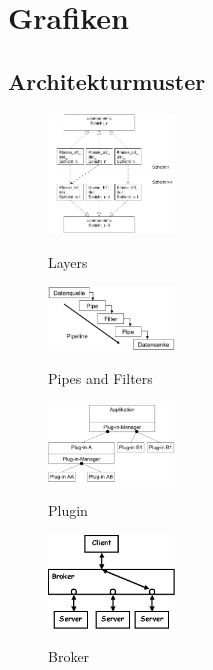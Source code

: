 \chapter{Grafiken}
\section{Architekturmuster}
\begin{figure}[h]
	\begin{center}
		\includegraphics[width=0.3\textwidth]{images/layers}
		\label{fig:layers}
		\caption{Layers}
	\end{center}
\end{figure}

\begin{figure}[h]
	\begin{center}
		\includegraphics[width=0.3\textwidth]{images/pipes_filters}
		\label{fig:pipes_filters}
		\caption{Pipes and Filters}
	\end{center}
\end{figure}

\begin{figure}[h]
	\begin{center}
		\includegraphics[width=0.3\textwidth]{images/plugin}
		\label{fig:plugin}
		\caption{Plugin}
	\end{center}
\end{figure}

\begin{figure}[h]
	\begin{center}
		\includegraphics[width=0.3\textwidth]{images/broker}
		\label{fig:broker}
		\caption{Broker}
	\end{center}
\end{figure}

